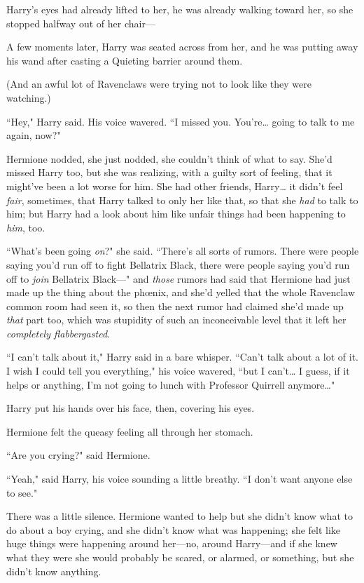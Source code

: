 Harry's eyes had already lifted to her, he was already walking toward her, so she stopped halfway out of her chair—

A few moments later, Harry was seated across from her, and he was putting away his wand after casting a Quieting barrier around them.

(And an awful lot of Ravenclaws were trying not to look like they were watching.)

``Hey," Harry said. His voice wavered. ``I missed you. You're{\ldots} going to talk to me again, now?"

Hermione nodded, she just nodded, she couldn't think of what to say. She'd missed Harry too, but she was realizing, with a guilty sort of feeling, that it might've been a lot worse for him. She had other friends, Harry{\ldots} it didn't feel \emph{fair}, sometimes, that Harry talked to only her like that, so that she \emph{had} to talk to him; but Harry had a look about him like unfair things had been happening to \emph{him}, too.

``What's been going \emph{on}?" she said. ``There's all sorts of rumors. There were people saying you'd run off to fight Bellatrix Black, there were people saying you'd run off to \emph{join} Bellatrix Black—" and \emph{those} rumors had said that Hermione had just made up the thing about the phœnix, and she'd yelled that the whole Ravenclaw common room had seen it, so then the next rumor had claimed she'd made up \emph{that} part too, which was stupidity of such an inconceivable level that it left her \emph{completely flabbergasted}.

``I can't talk about it," Harry said in a bare whisper. ``Can't talk about a lot of it. I wish I could tell you everything," his voice wavered, ``but I can't{\ldots} I guess, if it helps or anything, I'm not going to lunch with Professor Quirrell anymore{\ldots}"

Harry put his hands over his face, then, covering his eyes.

Hermione felt the queasy feeling all through her stomach.

``Are you crying?" said Hermione.

``Yeah," said Harry, his voice sounding a little breathy. ``I don't want anyone else to see."

There was a little silence. Hermione wanted to help but she didn't know what to do about a boy crying, and she didn't know what was happening; she felt like huge things were happening around her—no, around Harry—and if she knew what they were she would probably be scared, or alarmed, or something, but she didn't know anything.

